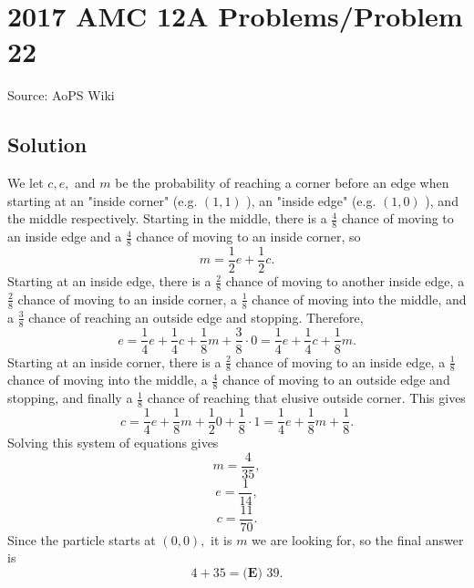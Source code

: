 \documentclass[12pt]{article}
\begin{document}
\section*{{2017 AMC 12A Problems/Problem 22}}
Source: AoPS Wiki

\subsection*{Solution}
We let $c, e,$ and $m$ be the probability of reaching a corner before an edge when starting at an "inside corner" (e.g. $(1, 1)$ ), an "inside edge" (e.g. $(1, 0)$ ), and the middle respectively. Starting in the middle, there is a $\frac{4}{8}$ chance of moving to an inside edge and a $\frac{4}{8}$ chance of moving to an inside corner, so \[m = \frac{1}{2}e + \frac{1}{2}c.\] Starting at an inside edge, there is a $\frac{2}{8}$ chance of moving to another inside edge, a $\frac{2}{8}$ chance of moving to an inside corner, a $\frac{1}{8}$ chance of moving into the middle, and a $\frac{3}{8}$ chance of reaching an outside edge and stopping. Therefore, \[e = \frac{1}{4}e + \frac{1}{4}c + \frac{1}{8}m + \frac{3}{8}\cdot 0 = \frac{1}{4}e + \frac{1}{4}c + \frac{1}{8}m.\] Starting at an inside corner, there is a $\frac{2}{8}$ chance of moving to an inside edge, a $\frac{1}{8}$ chance of moving into the middle, a $\frac{4}{8}$ chance of moving to an outside edge and stopping, and finally a $\frac{1}{8}$ chance of reaching that elusive outside corner. This gives \[c = \frac{1}{4}e + \frac{1}{8}m + \frac{1}{2}0 + \frac{1}{8}\cdot 1 = \frac{1}{4}e + \frac{1}{8}m + \frac{1}{8}.\] Solving this system of equations gives \[m = \frac{4}{35},\] \[e = \frac{1}{14},\] \[c = \frac{11}{70}.\] Since the particle starts at $(0, 0),$ it is $m$ we are looking for, so the final answer is \[4 + 35 = \boxed{\textbf{(E) }39}.\]
\end{document}
